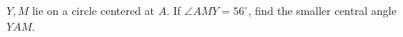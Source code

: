 $Y,M$ lie on a circle centered at $A$. If $\angle AMY=56^\circ$, find the smaller central angle $YAM$.
